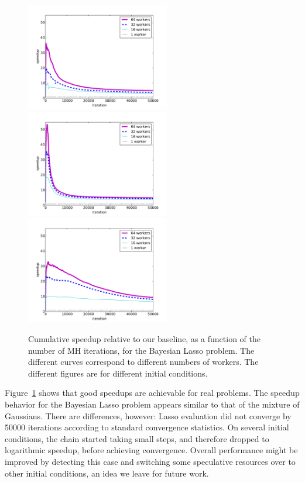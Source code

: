 \documentclass[angelino.tex]{subfiles}
\begin{document}
\begin{figure}[t!]
\centering
\vspace{-0.3in}
\includegraphics[width=0.56\textwidth]{figs/blasso/blasso-0_1-speedup-depth.pdf}
\includegraphics[width=0.56\textwidth]{figs/blasso/blasso-0_01-speedup-depth.pdf}
\includegraphics[width=0.56\textwidth]{figs/blasso/blasso-0_1-2-speedup-depth.pdf}
\caption{Cumulative speedup relative to our baseline,
as a function of the number of MH iterations, for the Bayesian Lasso problem.
The different curves correspond to different numbers of workers.
The different figures are for different initial conditions.}
\label{fig:lasso}
\end{figure}

Figure~\ref{fig:lasso} shows that good speedups are achievable for real problems.
%
The speedup behavior for the Bayesian Lasso problem appears similar to that of the mixture of Gaussians.
%
There are differences, however: Lasso evaluation did not converge by 50000 iterations according to standard convergence statistics. On several initial conditions, the chain started taking small steps, and therefore dropped to logarithmic speedup, before achieving convergence.
%
Overall performance might be improved by detecting this case and switching some speculative resources over to other initial conditions, an idea we leave for future work.
\end{document}
